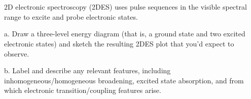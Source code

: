 \documentclass[12pt]{article}
\begin{document}
\section{}
$2 \mathrm{D}$ electronic spectroscopy (2DES) uses pulse sequences in the visible spectral range to excite and probe electronic states.


a. Draw a three-level energy diagram (that is, a ground state and two excited electronic states) and sketch the resulting 2DES plot that you'd expect to observe.

b. Label and describe any relevant features, including inhomogeneous/homogeneous broadening, excited state absorption, and from which electronic transition/coupling features arise.
\end{document}
